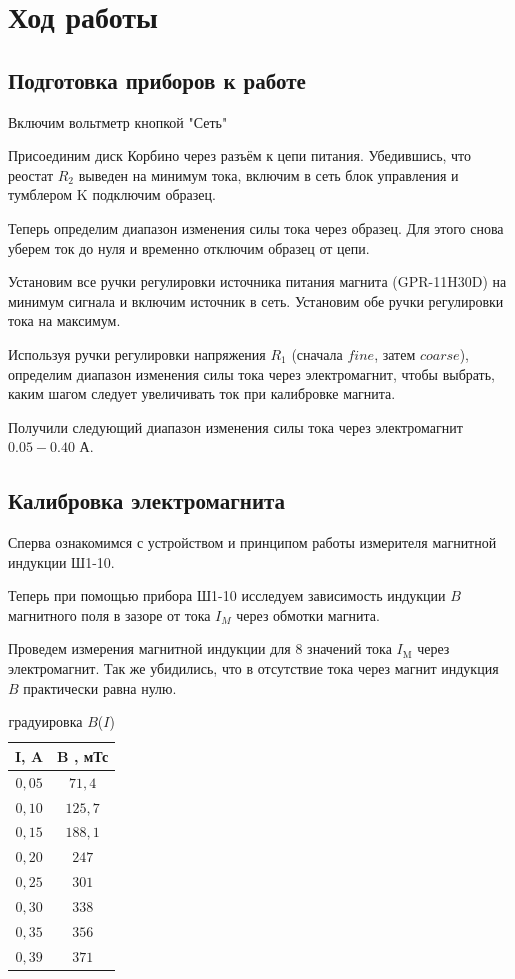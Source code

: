 \documentclass[a4paper, 12pt]{article}%
\begin{document}
\section{Ход работы}

\subsection{Подготовка приборов к работе}

Включим вольтметр кнопкой "Сеть"

Присоединим диск Корбино через разъём к цепи питания. Убедившись, что реостат $R_{2}$ выведен на минимум тока, включим в сеть блок управления и тумблером $\mathrm{K}$ подключим образец.

Теперь определим диапазон изменения силы тока через образец. Для этого снова уберем ток до нуля и временно отключим образец от цепи. 

Установим все ручки регулировки источника питания магнита (GPR-11H30D) на минимум сигнала и включим источник в сеть. Установим обе ручки регулировки тока на максимум.

Используя ручки регулировки напряжения $R_{1}$ (сначала $fine$, затем $coarse$), определим диапазон изменения силы тока через электромагнит, чтобы выбрать, каким шагом следует увеличивать ток при калибровке магнита. 

Получили следующий диапазон изменения силы тока через электромагнит $0.05 - 0.40$ А.


\subsection{Калибровка электромагнита}

Сперва ознакомимся с устройством и принципом работы измерителя магнитной индукции Ш1-10.

Теперь при помощью прибора Ш1-10 исследуем зависимость индукции $B$ магнитного поля в зазоре от тока $I_{M}$ через обмотки магнита.

Проведем измерения магнитной индукции для 8 значений тока $I_{\mathrm{M}}$ через электромагнит. Так же убидились, что в отсутствие тока через магнит индукция $B$ практически равна нулю.


\begin{table}
\begin{center}
\begin{tabular}{|c|c|}
\hline I, A & B , мТс	\\
\hline $0,05$ & $71,4$ 	\\
\hline $0,10$ & $125,7$ 	\\
\hline $0,15$ & $188,1$ 	\\
\hline $0,20$ & $247$ 	\\
\hline $0,25$ & $301$ 	\\
\hline $0,30$ & $338$ 	\\
\hline $0,35$ & $356$ 	\\
\hline $0,39$ & $371$ 	\\
\hline
\end{tabular}
\caption{градуировка $B$($I$)}
\end{center}
\end{table}
\end{document}
